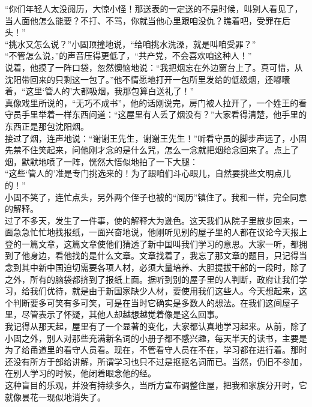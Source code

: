 “你们年轻人太没阅历，大惊小怪！那送表的一定送的不是时候，叫别人看见了，当人面他怎么能要？不打、不骂，你就当他心里跟咱没仇？瞧着吧，受罪在后头！”\\

“挑水又怎么说？”小固顶撞地说，“给咱挑水洗澡，就是叫咱受罪？”\\

“不管怎么说，”的声音压得更低了，“共产党，不会喜欢咱这种人！”\\

说着，他摸了一阵口袋，忽然懊恼地说：“我把烟忘在外边窗台上了。真可惜，从沈阳带回来的只剩这一包了。”他不情愿地打开一包所里发给的低级烟，还嘟囔着，“这里‘管人的’大都吸烟，我那包算白送礼了！”\\

真像戏里所说的，“无巧不成书”，他的话刚说完，房门被人拉开了，一个姓王的看守员手里举着一样东西问道：“这屋里有人丢了烟没有？”大家看得清楚，他手里的东西正是那包沈阳烟。\\

接过了烟，连声地说：“谢谢王先生，谢谢王先生！”听看守员的脚步声远了，小固先禁不住笑起来，问他刚才念的是什么咒，怎么一念就把烟给念回来了。点上了烟，默默地喷了一阵，恍然大悟似地拍了一下大腿：\\

“这些‘管人的’准是专门挑选来的！为了跟咱们斗心眼儿，自然要挑些文明点儿的！”\\

小固不笑了，连忙点头，另外两个侄子也被的“阅历”镇住了。我和一样，完全同意的解释。\\

过了不多天，发生了一件事，使的解释大为逊色。这天我们从院子里散步回来，一面急急忙忙地找报纸，一面兴奋地说，他刚听见别的屋子里的人都在议论今天报上登的一篇文章，这篇文章使他们猜透了新中国叫我们学习的意思。大家一听，都拥到了他身边，看他找的是什么文章。文章找着了，我忘了那文章的题目，只记得当念到其中新中国迫切需要各项人材，必须大量培养、大胆提拔干部的一段时，除了之外，所有的脑袋都挤到了报纸上面。据听到别的屋子里的人判断，政府让我们学习，给我们优待，就是由于新国家缺少人材，要使用我们这些人。今天想起来，这个判断要多可笑有多可笑，可是在当时它确实是多数人的想法。在我们这间屋子里，尽管表示了怀疑，其他人却越想越觉着像是这么回事。\\

我记得从那天起，屋里有了一个显著的变化，大家都认真地学习起来。从前，除了小固之外，别人对那些充满新名词的小册子都不感兴趣，每天半天的读书，主要是为了给甬道里的看守人员看。现在，不管看守人员在不在，学习都在进行着。那时还没有所方于部给讲解，所谓学习也只不过是抠抠名词而已。当然，仍旧不参加，在别人学习的时候，他闭着眼念他的经。\\

这种盲目的乐观，并没有持续多久，当所方宣布调整住屋，把我和家族分开时，它就像昙花一现似地消失了。